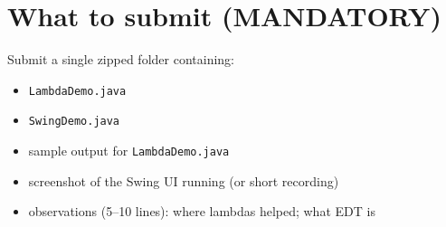 \documentclass[11pt]{article}
\begin{document}
\section{What to submit (MANDATORY)}
Submit a single zipped folder containing:
\begin{itemize}[leftmargin=*]
  \item \texttt{LambdaDemo.java}
  \item \texttt{SwingDemo.java}
  \item sample output for \texttt{LambdaDemo.java}
  \item screenshot of the Swing UI running (or short recording)
  \item observations (5--10 lines): where lambdas helped; what EDT is
\end{itemize}

\notesources{\OOPSUnitIVSources}
\end{document}

